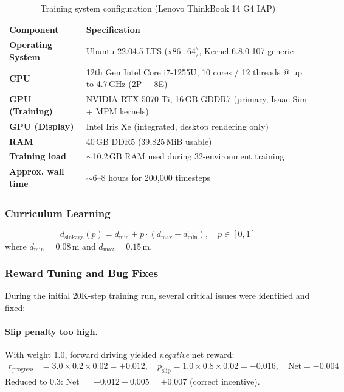 \documentclass[12pt,a4paper]{article}
\begin{document}
\begin{tcolorbox}[dashedbox, left=0pt, right=0pt, top=4pt, bottom=4pt]
\begin{table}[H]
\centering
\caption{Training system configuration (Lenovo ThinkBook 14 G4 IAP)}
\label{tab:hardware}
\small
\setlength{\tabcolsep}{6pt}
\renewcommand{\arraystretch}{1.4}
\begin{tabularx}{\textwidth}{>{\raggedright}p{3.8cm} X}
\toprule
\rowcolor{gray!20}
\textbf{Component} & \textbf{Specification} \\
\midrule
\textbf{Operating System} & Ubuntu 22.04.5 LTS (x86\_64), Kernel 6.8.0-107-generic \\
\textbf{CPU} & 12th Gen Intel Core i7-1255U, 10 cores / 12 threads @ up to 4.7\,GHz (2P + 8E) \\
\textbf{GPU (Training)} & NVIDIA RTX 5070 Ti, 16\,GB GDDR7 (primary, Isaac Sim + MPM kernels) \\
\textbf{GPU (Display)} & Intel Iris Xe (integrated, desktop rendering only) \\
\textbf{RAM} & 40\,GB DDR5 (39{,}825\,MiB usable) \\
\textbf{Training load} & $\sim$10.2\,GB RAM used during 32-environment training \\
\textbf{Approx. wall time} & $\sim$6--8 hours for 200{,}000 timesteps \\
\bottomrule
\end{tabularx}
\end{table}
\end{tcolorbox}


\subsubsection{Curriculum Learning}

\begin{equation}
d_{\text{sinkage}}(p) = d_{\min} + p \cdot (d_{\max} - d_{\min}), \quad p \in [0, 1]
\end{equation}
where $d_{\min} = 0.08$\,m and $d_{\max} = 0.15$\,m.


\subsubsection{Reward Tuning and Bug Fixes}
\label{sec:reward_tuning}

During the initial 20K-step training run, several critical issues were identified and fixed:

\paragraph{Slip penalty too high.} With weight 1.0, forward driving yielded \textit{negative} net reward:
\begin{align}
r_{\text{progress}} &= 3.0 \times 0.2 \times 0.02 = +0.012, \quad
p_{\text{slip}} = 1.0 \times 0.8 \times 0.02 = -0.016, \quad
\text{Net} = -0.004
\end{align}
Reduced to 0.3: Net $= +0.012 - 0.005 = +0.007$ (correct incentive).
\end{document}
